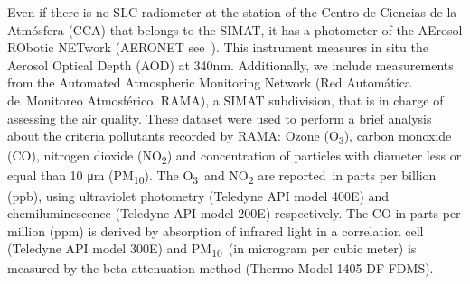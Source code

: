 \documentclass{article}
\begin{document}
{Even if there is no SLC radiometer at the station of the Centro de
Ciencias de la Atmósfera (CCA) that belongs to the SIMAT, it has a
photometer of the AErosol RObotic NETwork (AERONET
see~\cite{Holben_1998}). This instrument measures in situ the Aerosol
Optical Depth (AOD) at 340nm. Additionally, we include measurements from
the Automated Atmospheric Monitoring Network (Red Automática
de~Monitoreo Atmosférico, RAMA), a SIMAT subdivision, that is in charge
of assessing the air quality. These dataset were used to perform a brief
analysis about the criteria pollutants recorded by RAMA: Ozone
(O\textsubscript{3}), carbon monoxide (CO), nitrogen dioxide
(NO\textsubscript{2}) and concentration of particles with diameter less
or equal than 10 μm (PM\textsubscript{10}). The O\textsubscript{3}~and
NO\textsubscript{2} are reported~in parts per billion (ppb), using
ultraviolet photometry (Teledyne API model 400E) and chemiluminescence
(Teledyne-API model 200E) respectively. The CO in parts per million
(ppm) is derived by absorption of infrared light in a correlation cell
(Teledyne API model 300E) and PM\textsubscript{10}~(in microgram per
cubic meter) is measured by the beta attenuation method (Thermo Model
1405-DF FDMS).

}
\end{document}
